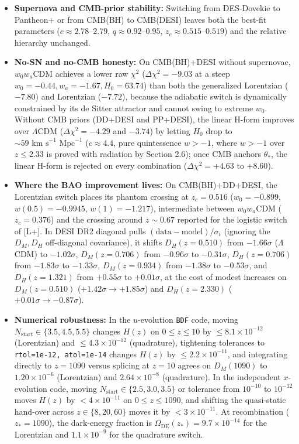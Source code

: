 \documentclass[11pt,a4paper]{article}
\begin{document}
\begin{itemize}
\item{} {\bfseries\boldmath Supernova and CMB-prior stability:} Switching from DES-Dovekie to Pantheon+ or from CMB(BH) to CMB(DESI) leaves both the best-fit parameters ($c \approx 2.78\text{--}2.79$, $q \approx 0.92\text{--}0.95$, $z_c \approx 0.515\text{--}0.519$) and the relative hierarchy unchanged.
\item{} {\bfseries\boldmath No-SN and no-CMB honesty:} On CMB(BH)+DESI without supernovae, $w_0 w_a$CDM achieves a lower raw $\chi^2$ ($\Delta\chi^2 = -9.03$ at a steep $w_0 = -0.44, w_a = -1.67, H_0 = 63.74$) than both the generalized Lorentzian ($-7.80$) and Lorentzian ($-7.72$), because the adiabatic switch is dynamically constrained by its de Sitter attractor and cannot swing to extreme $w_0$. Without CMB priors (DD+DESI and PP+DESI), the linear H-form improves over $\Lambda$CDM ($\Delta\chi^2 = -4.29$ and $-3.74$) by letting $H_0$ drop to $\sim 59\text{ km s}^{-1}\text{ Mpc}^{-1}$ ($c \approx 4.4$, pure quintessence $w > -1$, where $w > -1$ over $z \le 2.33$ is proved with radiation by Section 2.6); once CMB anchors $\theta_*$, the linear H-form is rejected on every combination ($\Delta\chi^2 = +4.63$ to $+8.60$).
\item{} {\bfseries\boldmath Where the BAO improvement lives:} On CMB(BH)+DD+DESI, the Lorentzian switch places its phantom crossing at $z_c = 0.516$ ($w_0 = -0.899$, $w(0.5) = -0.9945$, $w(1) = -1.217$), intermediate between $w_0 w_a$CDM ($z_c = 0.376$) and the crossing around $z \sim 0.67$ reported for the logistic switch of [L+]. In DESI DR2 diagonal pulls $(\text{data} - \text{model})/\sigma_i$ (ignoring the $D_M, D_H$ off-diagonal covariance), it shifts $D_H(z = 0.510)$ from $-1.66\sigma$ ($\Lambda$CDM) to $-1.02\sigma$, $D_M(z = 0.706)$ from $-0.96\sigma$ to $-0.31\sigma$, $D_H(z = 0.706)$ from $-1.83\sigma$ to $-1.33\sigma$, $D_M(z = 0.934)$ from $-1.38\sigma$ to $-0.53\sigma$, and $D_H(z = 1.321)$ from $+0.55\sigma$ to $+0.01\sigma$, at the cost of modest increases on $D_M(z = 0.510)$ ($+1.42\sigma \to +1.85\sigma$) and $D_H(z = 2.330)$ ($+0.01\sigma \to -0.87\sigma$).
\item{} {\bfseries\boldmath Numerical robustness:} In the $u$-evolution \texttt{BDF} code, moving $N_{\text{start}} \in \{3.5, 4.5, 5.5\}$ changes $H(z)$ on $0 \le z \le 10$ by $\le 8.1 \times 10^{-12}$ (Lorentzian) and $\le 4.3 \times 10^{-12}$ (quadrature), tightening tolerances to \texttt{rtol=1e-12, atol=1e-14} changes $H(z)$ by $\le 2.2 \times 10^{-11}$, and integrating directly to $z = 1090$ versus splicing at $z = 10$ agrees on $D_M(1090)$ to $1.20 \times 10^{-6}$ (Lorentzian) and $2.64 \times 10^{-8}$ (quadrature). In the independent $x$-evolution code, moving $N_{\text{start}} \in \{2.5, 3.0, 3.5\}$ or tolerance from $10^{-10}$ to $10^{-12}$ moves $H(z)$ by $< 4 \times 10^{-11}$ on $0 \le z \le 1090$, and shifting the quasi-static hand-over across $z \in \{8, 20, 60\}$ moves it by $< 3 \times 10^{-11}$. At recombination ($z_* = 1090$), the dark-energy fraction is $\Omega_{\text{DE}}(z_*) = 9.7 \times 10^{-14}$ for the Lorentzian and $1.1 \times 10^{-9}$ for the quadrature switch.
\end{itemize}
\end{document}
